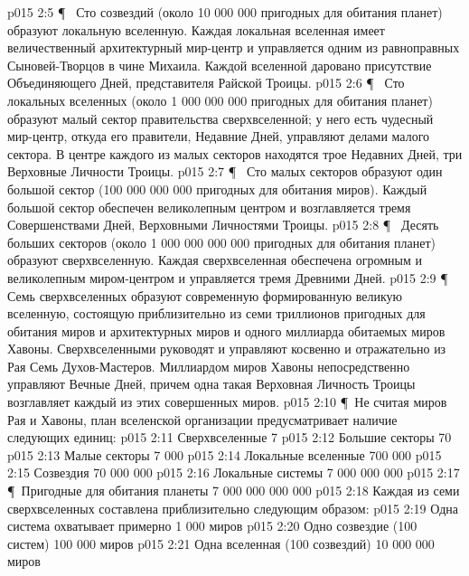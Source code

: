 \vs p015 2:5 \P\ \bibnobreakspace {} Сто созвездий (около 10 000 000 пригодных для обитания планет) образуют локальную вселенную. Каждая локальная вселенная имеет величественный архитектурный мир\hyp{}центр и управляется одним из равноправных Сыновей\hyp{}Творцов в чине Михаила. Каждой вселенной даровано присутствие Объединяющего Дней, представителя Райской Троицы.
\vs p015 2:6 \P\ \bibnobreakspace {} Сто локальных вселенных (около 1 000 000 000 пригодных для обитания планет) образуют малый сектор правительства сверхвселенной; у него есть чудесный мир\hyp{}центр, откуда его правители, Недавние Дней, управляют делами малого сектора. В центре каждого из малых секторов находятся трое Недавних Дней, три Верховные Личности Троицы.
\vs p015 2:7 \P\ \bibnobreakspace {} Сто малых секторов образуют один большой сектор (100 000 000 000 пригодных для обитания миров). Каждый большой сектор обеспечен великолепным центром и возглавляется тремя Совершенствами Дней, Верховными Личностями Троицы.
\vs p015 2:8 \P\ \bibnobreakspace {} Десять больших секторов (около 1 000 000 000 000 пригодных для обитания планет) образуют сверхвселенную. Каждая сверхвселенная обеспечена огромным и великолепным миром\hyp{}центром и управляется тремя Древними Дней.
\vs p015 2:9 \P\ \bibnobreakspace {} Семь сверхвселенных образуют современную формированную великую вселенную, состоящую приблизительно из семи триллионов пригодных для обитания миров и архитектурных миров и одного миллиарда обитаемых миров Хавоны. Сверхвселенными руководят и управляют косвенно и отражательно из Рая Семь Духов\hyp{}Мастеров. Миллиардом миров Хавоны непосредственно управляют Вечные Дней, причем одна такая Верховная Личность Троицы возглавляет каждый из этих совершенных миров.
\vs p015 2:10 \P\ Не считая миров Рая и Хавоны, план вселенской организации предусматривает наличие следующих единиц:
\vs p015 2:11 Сверхвселенные 7
\vs p015 2:12 Большие секторы 70
\vs p015 2:13 Малые секторы 7 000
\vs p015 2:14 Локальные вселенные 700 000
\vs p015 2:15 Созвездия 70 000 000
\vs p015 2:16 Локальные системы 7 000 000 000
\vs p015 2:17 \P\ Пригодные для обитания планеты 7 000 000 000 000
\vs p015 2:18 Каждая из семи сверхвселенных составлена приблизительно следующим образом:
\vs p015 2:19 Одна система охватывает примерно 1 000 миров
\vs p015 2:20 Одно созвездие (100 систем) 100 000 миров
\vs p015 2:21 Одна вселенная (100 созвездий) 10 000 000 миров
